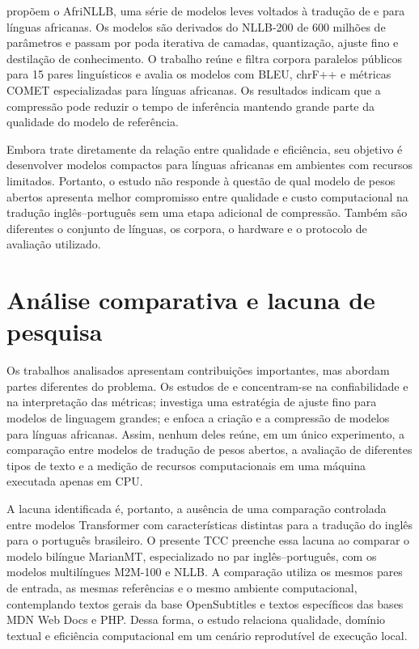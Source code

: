 \cite{moslem2026afrinllb} propõem o AfriNLLB, uma série de modelos leves voltados à tradução de e para línguas africanas. Os modelos são derivados do NLLB-200 de 600 milhões de parâmetros e passam por poda iterativa de camadas, quantização, ajuste fino e destilação de conhecimento. O trabalho reúne e filtra corpora paralelos públicos para 15 pares linguísticos e avalia os modelos com BLEU, chrF++ e métricas COMET especializadas para línguas africanas. Os resultados indicam que a compressão pode reduzir o tempo de inferência mantendo grande parte da qualidade do modelo de referência.

Embora \cite{moslem2026afrinllb} trate diretamente da relação entre qualidade e eficiência, seu objetivo é desenvolver modelos compactos para línguas africanas em ambientes com recursos limitados. Portanto, o estudo não responde à questão de qual modelo de pesos abertos apresenta melhor compromisso entre qualidade e custo computacional na tradução inglês--português sem uma etapa adicional de compressão. Também são diferentes o conjunto de línguas, os corpora, o hardware e o protocolo de avaliação utilizado.

\section{Análise comparativa e lacuna de pesquisa}

Os trabalhos analisados apresentam contribuições importantes, mas abordam partes diferentes do problema. Os estudos de \cite{mukherjee2025detailed} e \cite{di2025meta} concentram-se na confiabilidade e na interpretação das métricas; \cite{xu2309paradigm} investiga uma estratégia de ajuste fino para modelos de linguagem grandes; e \cite{moslem2026afrinllb} enfoca a criação e a compressão de modelos para línguas africanas. Assim, nenhum deles reúne, em um único experimento, a comparação entre modelos de tradução de pesos abertos, a avaliação de diferentes tipos de texto e a medição de recursos computacionais em uma máquina executada apenas em CPU.

A lacuna identificada é, portanto, a ausência de uma comparação controlada entre modelos Transformer com características distintas para a tradução do inglês para o português brasileiro. O presente TCC preenche essa lacuna ao comparar o modelo bilíngue MarianMT, especializado no par inglês--português, com os modelos multilíngues M2M-100 e NLLB. A comparação utiliza os mesmos pares de entrada, as mesmas referências e o mesmo ambiente computacional, contemplando textos gerais da base OpenSubtitles e textos específicos das bases MDN Web Docs e PHP. Dessa forma, o estudo relaciona qualidade, domínio textual e eficiência computacional em um cenário reprodutível de execução local.

